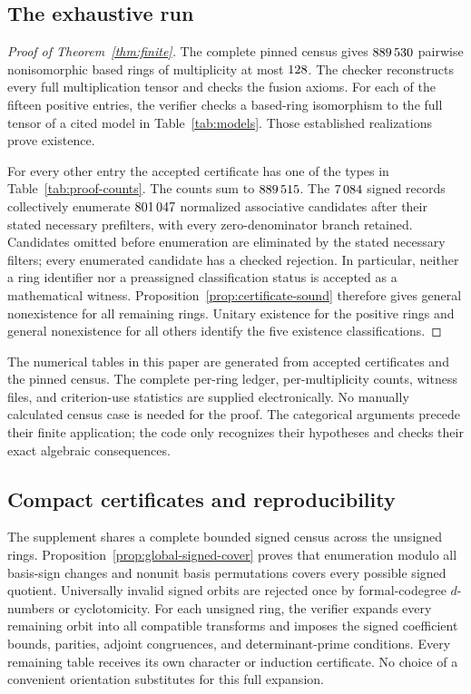 \subsection{The exhaustive run}
\begin{proof}[Proof of Theorem~\ref{thm:finite}]
The complete pinned census \cite{Census} gives
$889\,530$ pairwise nonisomorphic based rings of multiplicity at most
$128$. The checker reconstructs every full multiplication
tensor and checks the fusion axioms. For each of the fifteen positive entries, the
verifier checks a based-ring isomorphism to the full tensor of a cited
model in Table~\ref{tab:models}. Those established realizations prove
existence.

For every other entry the accepted certificate has one of the types in
Table~\ref{tab:proof-counts}. The counts sum to $889\,515$.
The $7\,084$ signed records collectively enumerate
$801\,047$ normalized associative candidates after their stated
necessary prefilters, with every zero-denominator branch retained.
Candidates omitted before enumeration are eliminated by the stated
necessary filters; every enumerated candidate has a checked rejection. In particular,
neither a ring identifier nor a preassigned classification status is
accepted as a mathematical witness. Proposition~\ref{prop:certificate-sound}
therefore gives general nonexistence for all remaining rings. Unitary
existence for the positive rings and general nonexistence for all others
identify the five existence classifications.
\end{proof}



The numerical tables in this paper are generated from accepted
certificates and the pinned census. The complete per-ring ledger,
per-multiplicity counts, witness files, and criterion-use statistics are
supplied electronically. No manually calculated census case is needed
for the proof. The categorical arguments precede their finite application;
the code only recognizes their hypotheses and checks their exact algebraic
consequences.

\subsection{Compact certificates and reproducibility}
The supplement shares a complete bounded signed census across the
unsigned rings. Proposition~\ref{prop:global-signed-cover} proves that
enumeration modulo all basis-sign changes and nonunit basis permutations
covers every possible signed quotient. Universally invalid signed orbits
are rejected once by formal-codegree $d$-numbers or cyclotomicity.
For each unsigned ring, the verifier expands every remaining orbit into
all compatible transforms and imposes the signed coefficient bounds,
parities, adjoint congruences, and determinant-prime conditions. Every
remaining table receives its own character or induction certificate.
No choice of a convenient orientation substitutes for this full expansion.

